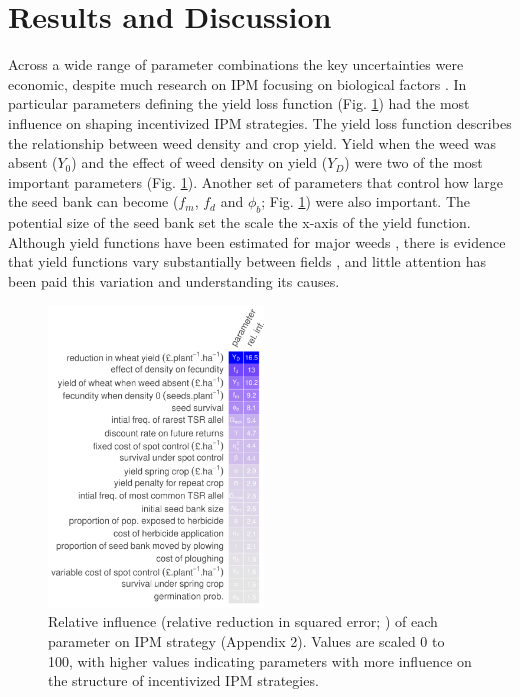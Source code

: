 \documentclass[9pt,twocolumn,twoside,lineno]{pnas-new}
\begin{document}
\section*{Results and Discussion}
Across a wide range of parameter combinations the key uncertainties were economic, despite much research on IPM focusing on biological factors \citep{Colb2006}. In particular parameters defining the yield loss function (Fig. \ref{fig:rel_inf}) had the most influence on shaping incentivized IPM strategies. The yield loss function describes the relationship between weed density and crop yield. Yield when the weed was absent ($Y_0$) and the effect of weed density on yield ($Y_D$) were two of the most important parameters (Fig. \ref{fig:rel_inf}). Another set of parameters that control how large the seed bank can become ($f_m$, $f_d$ and $\phi_b$; Fig. \ref{fig:rel_inf}) were also important. The potential size of the seed bank set the scale the x-axis of the yield function. Although yield functions have been estimated for major weeds \citep{Cous1985, Doyl1986, Swin1994}, there is evidence that yield functions vary substantially between fields \citep{Swin1994, Hick2018}, and little attention has been paid this variation and understanding its causes.
 \begin{figure}
	\centering
	\includegraphics[height=80mm]{rel_inf_mean.pdf}
	\caption{Relative influence (relative reduction in squared error; \citealp{Mill2016}) of each parameter on IPM strategy (Appendix 2). Values are scaled 0 to 100, with higher values indicating parameters with more influence on the structure of incentivized IPM strategies.}
	\label{fig:rel_inf} 
\end{figure}
\end{document}
